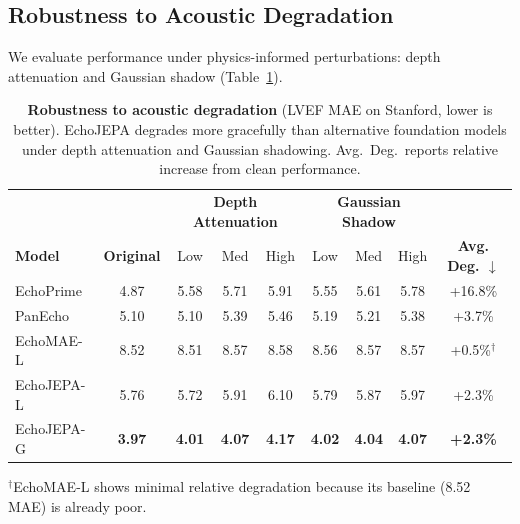 \documentclass{article}
\theoremstyle{plain}
\theoremstyle{definition}
\theoremstyle{remark}
\begin{document}
\subsection{Robustness to Acoustic Degradation}
\label{sec:exp:robustness}

We evaluate performance under physics-informed perturbations: depth attenuation and Gaussian shadow (Table~\ref{tab:robustness_full}).

\begin{table}[t]
    \centering
    \caption{
        \textbf{Robustness to acoustic degradation} (LVEF MAE on Stanford, lower is better).
        EchoJEPA degrades more gracefully than alternative foundation models under depth attenuation and Gaussian shadowing.
        Avg.\ Deg.\ reports relative increase from clean performance.
    }
    \label{tab:robustness_full}
    \vspace{0.5em}
    \small
    \begin{tabular}{@{}lc|ccc|ccc|c@{}}
        \toprule
        & & \multicolumn{3}{c|}{\textbf{Depth Attenuation}} & \multicolumn{3}{c|}{\textbf{Gaussian Shadow}} & \\
        \textbf{Model} & \textbf{Original} & Low & Med & High & Low & Med & High & \textbf{Avg. Deg. $\downarrow$} \\
        \midrule
        EchoPrime & 4.87 & 5.58 & 5.71 & 5.91 & 5.55 & 5.61 & 5.78 & +16.8\% \\
        PanEcho & 5.10 & 5.10 & 5.39 & 5.46 & 5.19 & 5.21 & 5.38 & +3.7\% \\
        \midrule
        EchoMAE-L & 8.52 & 8.51 & 8.57 & 8.58 & 8.56 & 8.57 & 8.57 & +0.5\%$^\dagger$ \\
        EchoJEPA-L & 5.76 & 5.72 & 5.91 & 6.10 & 5.79 & 5.87 & 5.97 & +2.3\% \\
        EchoJEPA-G & \textbf{3.97} & \textbf{4.01} & \textbf{4.07} & \textbf{4.17} & \textbf{4.02} & \textbf{4.04} & \textbf{4.07} & \textbf{+2.3\%} \\
        \bottomrule
    \end{tabular}
    \par\vspace{0.3em}
    \small{$^\dagger$EchoMAE-L shows minimal relative degradation because its baseline (8.52 MAE) is already poor.}
\end{table}
\end{document}
